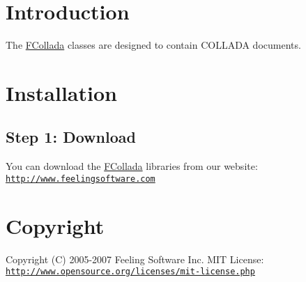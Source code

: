 \hypertarget{index_intro_sec}{}\section{Introduction}\label{index_intro_sec}
The \hyperlink{namespaceFCollada}{FCollada} classes are designed to contain COLLADA documents.\hypertarget{index_install_sec}{}\section{Installation}\label{index_install_sec}
\hypertarget{index_step1}{}\subsection{Step 1: Download}\label{index_step1}
You can download the \hyperlink{namespaceFCollada}{FCollada} libraries from our website: \href{http://www.feelingsoftware.com}{\tt http://www.feelingsoftware.com}\hypertarget{index_copyright}{}\section{Copyright}\label{index_copyright}
Copyright (C) 2005-\/2007 Feeling Software Inc. MIT License: \href{http://www.opensource.org/licenses/mit-license.php}{\tt http://www.opensource.org/licenses/mit-\/license.php} 